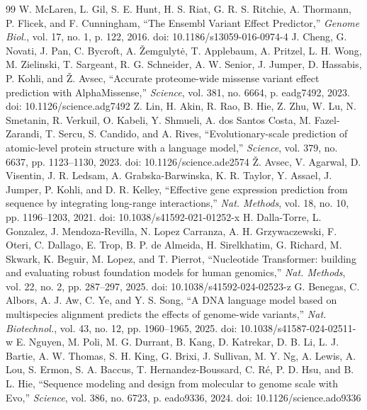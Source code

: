 \begin{thebibliography}{99}
 W. McLaren, L. Gil, S. E. Hunt, H. S. Riat, G. R. S. Ritchie, A. Thormann, P. Flicek, and F. Cunningham, ``The Ensembl Variant Effect Predictor,'' \emph{Genome Biol.}, vol. 17, no. 1, p. 122, 2016. doi: 10.1186/\allowbreak s13059-016-0974-4
 J. Cheng, G. Novati, J. Pan, C. Bycroft, A. Žemgulytė, T. Applebaum, A. Pritzel, L. H. Wong, M. Zielinski, T. Sargeant, R. G. Schneider, A. W. Senior, J. Jumper, D. Hassabis, P. Kohli, and Ž. Avsec, ``Accurate proteome-wide missense variant effect prediction with AlphaMissense,'' \emph{Science}, vol. 381, no. 6664, p. eadg7492, 2023. doi: 10.1126/\allowbreak science.adg7492
 Z. Lin, H. Akin, R. Rao, B. Hie, Z. Zhu, W. Lu, N. Smetanin, R. Verkuil, O. Kabeli, Y. Shmueli, A. dos Santos Costa, M. Fazel-Zarandi, T. Sercu, S. Candido, and A. Rives, ``Evolutionary-scale prediction of atomic-level protein structure with a language model,'' \emph{Science}, vol. 379, no. 6637, pp. 1123--1130, 2023. doi: 10.1126/\allowbreak science.ade2574
 Ž. Avsec, V. Agarwal, D. Visentin, J. R. Ledsam, A. Grabska-Barwinska, K. R. Taylor, Y. Assael, J. Jumper, P. Kohli, and D. R. Kelley, ``Effective gene expression prediction from sequence by integrating long-range interactions,'' \emph{Nat. Methods}, vol. 18, no. 10, pp. 1196--1203, 2021. doi: 10.1038/\allowbreak s41592-021-01252-x
 H. Dalla-Torre, L. Gonzalez, J. Mendoza-Revilla, N. Lopez Carranza, A. H. Grzywaczewski, F. Oteri, C. Dallago, E. Trop, B. P. de Almeida, H. Sirelkhatim, G. Richard, M. Skwark, K. Beguir, M. Lopez, and T. Pierrot, ``Nucleotide Transformer: building and evaluating robust foundation models for human genomics,'' \emph{Nat. Methods}, vol. 22, no. 2, pp. 287--297, 2025. doi: 10.1038/\allowbreak s41592-024-02523-z
 G. Benegas, C. Albors, A. J. Aw, C. Ye, and Y. S. Song, ``A DNA language model based on multispecies alignment predicts the effects of genome-wide variants,'' \emph{Nat. Biotechnol.}, vol. 43, no. 12, pp. 1960--1965, 2025. doi: 10.1038/\allowbreak s41587-024-02511-w
 E. Nguyen, M. Poli, M. G. Durrant, B. Kang, D. Katrekar, D. B. Li, L. J. Bartie, A. W. Thomas, S. H. King, G. Brixi, J. Sullivan, M. Y. Ng, A. Lewis, A. Lou, S. Ermon, S. A. Baccus, T. Hernandez-Boussard, C. Ré, P. D. Hsu, and B. L. Hie, ``Sequence modeling and design from molecular to genome scale with Evo,'' \emph{Science}, vol. 386, no. 6723, p. eado9336, 2024. doi: 10.1126/\allowbreak science.ado9336

\end{thebibliography}
